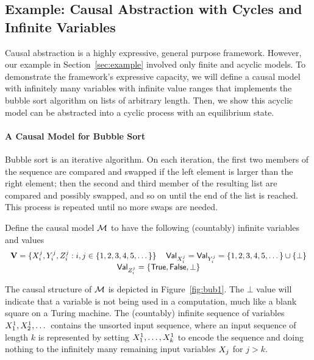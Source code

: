 \documentclass[twoside,11pt]{article}
\begin{document}
\subsection{Example: Causal Abstraction with Cycles and Infinite Variables}\label{sec:future}
Causal abstraction is a highly expressive, general purpose framework. However, our example in Section~\ref{sec:example} involved only finite and acyclic models. To demonstrate the framework's expressive capacity, we will define a causal model with infinitely many variables with infinite value ranges that implements the bubble sort algorithm on lists of arbitrary length. Then, we show this acyclic model can be abstracted into a cyclic process with an equilibrium state. 

\paragraph{A Causal Model for Bubble Sort}\label{sec:example2}
Bubble sort is an iterative algorithm. On each iteration, the first two members of the sequence are compared and swapped if the left element is larger than the right element; then the second and third member of the resulting list are compared and possibly swapped, and so on until the end of the list is reached. This process is repeated until no more swaps are needed. 

Define the causal model $\mathcal{M}$ to have the following (countably) infinite variables and values 
\[\begin{tabular}{cc c}
     $\allvars = \{\onevar_i^j,\onevarr_i^j,\onevarrr^j_i: i,j \in \{1,2,3,4,5,\dots\}\}$& $\values{\onevar^j_i} = \values{\onevarr^j_i} = \{1,2,3,4,5,\dots\} \cup \{\bot\}$\\ 
 \multicolumn{2}{c}{$\values{\onevarrr_i^j} = \{\mathsf{True}, \mathsf{False}, \bot\}$}\\    
\end{tabular}\]



The causal structure of $\mathcal{M}$ is depicted in Figure~\ref{fig:bub1}. The $\bot$ value will indicate that a variable is not being used in a computation, much like a blank square on a Turing machine. The (countably) infinite sequence of variables $X^1_1, X^1_2, \dots$ contains the unsorted input sequence, where an input sequence of length $k$ is represented by setting $X_1^1, \dots, X_k^1$ to encode the sequence and doing nothing to the infinitely many remaining input variables $X_j$ for $j>k$.
\end{document}
